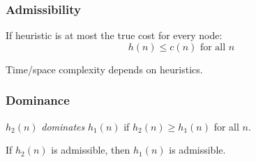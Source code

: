 \documentclass{article}
\begin{document}
    \subsubsection{Admissibility}

    If heuristic is at most the true cost for every node: $$h(n) \leq c(n) \text{ for all } n$$

    Time/space complexity depends on heuristics.
    
    \subsubsection{Dominance}

    $h_2(n)$ \textit{dominates} $h_1(n)$ if $h_2(n) \geq h_1(n)$ for all $n$.

    If $h_2(n)$ is admissible, then $h_1(n)$ is admissible.
\end{document}
